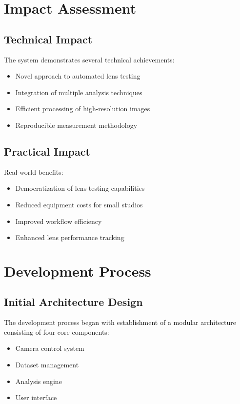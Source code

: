 \section{Impact Assessment}

\subsection{Technical Impact}
The system demonstrates several technical achievements:
\begin{itemize}
    \item Novel approach to automated lens testing
    \item Integration of multiple analysis techniques
    \item Efficient processing of high-resolution images
    \item Reproducible measurement methodology
\end{itemize}

\subsection{Practical Impact}
Real-world benefits:
\begin{itemize}
    \item Democratization of lens testing capabilities
    \item Reduced equipment costs for small studios
    \item Improved workflow efficiency
    \item Enhanced lens performance tracking
\end{itemize}

\section{Development Process}

\subsection{Initial Architecture Design}
The development process began with establishment of a modular architecture consisting of four core components:

\begin{itemize}
    \item Camera control system
    \item Dataset management
    \item Analysis engine
    \item User interface
\end{itemize}

